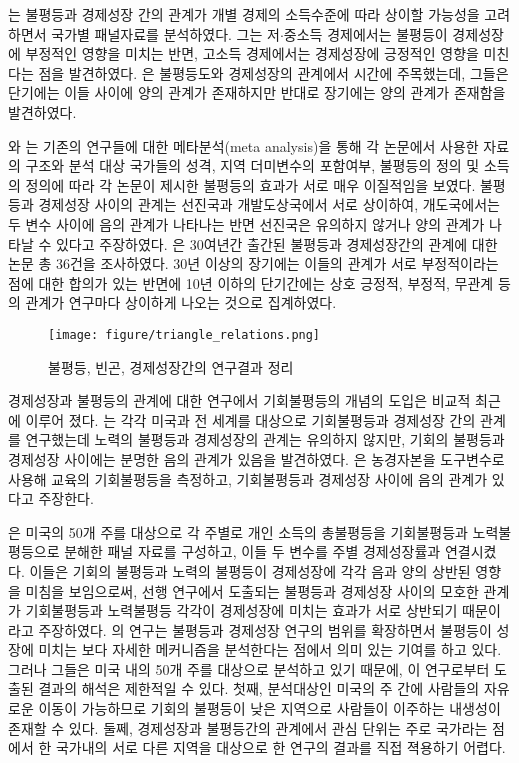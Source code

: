 \cite{cc10}는 불평등과 경제성장 간의 관계가 개별 경제의 소득수준에 따라 상이할 가능성을 고려하면서 국가별 패널자료를 분석하였다.
그는 저$\cdot$중소득 경제에서는 불평등이 경제성장에 부정적인 영향을 미치는 반면, 고소득 경제에서는 경제성장에 긍정적인 영향을 미친다는 점을 발견하였다.
\cite{hetl14}은 불평등도와 경제성장의 관계에서 시간에 주목했는데, 그들은 단기에는 이들 사이에 양의 관계가 존재하지만 반대로 장기에는 양의 관계가 존재함을 발견하였다.

\cite{nns13}와 \cite{nns16}는 기존의 연구들에 대한 메타분석(meta analysis)을 통해 각 논문에서 사용한 자료의 구조와 분석 대상 국가들의 성격, 지역 더미변수의 포함여부, 불평등의 정의 및 소득의 정의에 따라 각 논문이 제시한 불평등의 효과가 서로 매우 이질적임을 보였다.
불평등과 경제성장 사이의 관계는 선진국과 개발도상국에서 서로 상이하여, 개도국에서는 두 변수 사이에 음의 관계가 나타나는 반면 선진국은 유의하지 않거나 양의 관계가 나타날 수 있다고 주장하였다.
\cite{cetl21}은 30여년간 출간된 불평등과 경제성장간의 관계에 대한 논문 총 36건을 조사하였다.
30년 이상의 장기에는 이들의 관계가 서로 부정적이라는 점에 대한 합의가 있는 반면에 10년 이하의 단기간에는 상호 긍정적, 부정적, 무관계 등의 관계가 연구마다 상이하게 나오는 것으로 집계하였다.

\begin{figure}
    \centering
    \texttt{[image: figure/triangle\_relations.png]}
    \caption{불평등, 빈곤, 경제성장간의 연구결과 정리}
    \label{fig:triangle relations}
\end{figure}

경제성장과 불평등의 관계에 대한 연구에서 기회불평등의 개념의 도입은 비교적 최근에 이루어 졌다.
\cite{mnr13, mnr14}는 각각 미국과 전 세계를 대상으로 기회불평등과 경제성장 간의 관계를 연구했는데 노력의 불평등과 경제성장의 관계는 유의하지 않지만, 기회의 불평등과 경제성장 사이에는 분명한 음의 관계가 있음을 발견하였다.
\cite{metl13}은 농경자본을 도구변수로 사용해 교육의 기회불평등을 측정하고, 기회불평등과 경제성장 사이에 음의 관계가 있다고 주장한다.

\cite{mnr13}은 미국의 50개 주를 대상으로 각 주별로 개인 소득의 총불평등을 기회불평등과 노력불평등으로 분해한 패널 자료를 구성하고, 이들 두 변수를 주별 경제성장률과 연결시켰다.
이들은 기회의 불평등과 노력의 불평등이 경제성장에 각각 음과 양의 상반된 영향을 미침을 보임으로써, 선행 연구에서 도출되는 불평등과 경제성장 사이의 모호한 관계가 기회불평등과 노력불평등 각각이 경제성장에 미치는 효과가 서로 상반되기 때문이라고 주장하였다.
\cite{mnr13}의 연구는 불평등과 경제성장 연구의 범위를 확장하면서 불평등이 성장에 미치는 보다 자세한 메커니즘을 분석한다는 점에서 의미 있는 기여를 하고 있다.
그러나 그들은 미국 내의 50개 주를 대상으로 분석하고 있기 때문에, 이 연구로부터 도출된 결과의 해석은 제한적일 수 있다.
첫째, 분석대상인 미국의 주 간에 사람들의 자유로운 이동이 가능하므로 기회의 불평등이 낮은 지역으로 사람들이 이주하는 내생성이 존재할 수 있다.
둘쩨, 경제성장과 불평등간의 관계에서 관심 단위는 주로 국가라는 점에서 한 국가내의 서로 다른 지역을 대상으로 한 연구의 결과를 직접 젹용하기 어렵다.

